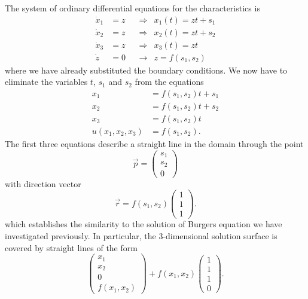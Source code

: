 The system of ordinary differential equations for the characteristics is
\begin{align*}
\dot{x}_1 &= z &&\Rightarrow& x_1(t) = zt + s_1
\\
\dot{x}_2 &= z &&\Rightarrow& x_2(t) = zt + s_2
\\
\dot{x}_3 &= z &&\Rightarrow& x_3(t) = zt
\\
\dot{z} &= 0 &&\rightarrow& z = f(s_1,s_2)
\end{align*}
where we have already substituted the boundary conditions.
We now have to eliminate the variables $t$, $s_1$ and $s_2$ from the
equations
\[
\begin{aligned}
x_1 &= f(s_1,s_2)t + s_1 \\
x_2 &= f(s_1,s_2)t + s_2 \\
x_3 &= f(s_1,s_2)t       \\
u(x_1,x_2,x_3) &= f(s_1,s_2).
\end{aligned}
\]
The first three equations describe a straight line
in the domain
through the point
\[
\vec{p}
=\begin{pmatrix}
s_1\\s_2\\0
\end{pmatrix}
\]
with direction vector
\[
\vec{r}
=
f(s_1,s_2)
\begin{pmatrix} 
1\\1\\1
\end{pmatrix}.
\]
which establishes the similarity to the solution of Burgers equation
we have investigated previously.
In particular, the $3$-dimensional solution surface is covered by straight
lines
of the form
\[
\begin{pmatrix}
x_1\\
x_2\\
0\\
f(x_1,x_2)
\end{pmatrix}
+
f(x_1,x_2)\begin{pmatrix}1\\1\\1\\0\end{pmatrix}.
\]
